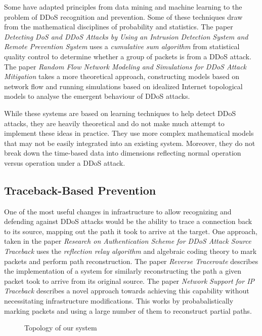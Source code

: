 \documentclass[twocolumn]{article}
\begin{document}
Some have adapted principles from data mining and machine learning to the problem of DDoS recognition and prevention. Some of these techniques draw from the mathematical disciplines of probability and statistics. The paper \emph{Detecting DoS and DDoS Attacks by Using an Intrusion Detection System and Remote Prevention System} \cite{intrusion} uses a \emph{cumulative sum algorithm} from statistical quality control to determine whether a group of packets is from a DDoS attack. The paper \emph{Random Flow Network Modeling and Simulations for DDoS Attack Mitigation} \cite{flow} takes a more theoretical approach, constructing models based on network flow and running simulations based on idealized Internet topological models to analyse the emergent behaviour of DDoS attacks.

While these systems are based on learning techniques to help detect DDoS attacks, they are heavily theoretical and do not make much attempt to implement these ideas in practice. They use more complex mathematical models that may not be easily integrated into an existing system. Moreover, they do not break down the time-based data into dimensions reflecting normal operation versus operation under a DDoS attack.

\subsection{Traceback-Based Prevention}

One of the most useful changes in infrastructure to allow recognizing and defending against DDoS attacks would be the ability to trace a connection back to its source, mapping out the path it took to arrive at the target. One approach, taken in the paper \emph{Research on Authentication Scheme for DDoS Attack Source Traceback} \cite{auth} uses the \emph{reflection relay algorithm} and algebraic coding theory to mark packets and perform path reconstruction. The paper \emph{Reverse Traceroute} \cite{traceroute} describes the implementation of a system for similarly reconstructing the path a given packet took to arrive from its original source. The paper \emph{Network Support for IP Traceback} \cite{traceback} describes a novel approach towards achieving this capability without necessitating infrastructure modifications. This works by probabalistically marking packets and using a large number of them to reconstruct partial paths.


\begin{figure}
\begin{center}

\end{center}
\caption{Topology of our system}
\label{fig:designtopology}
\end{figure}
\end{document}
